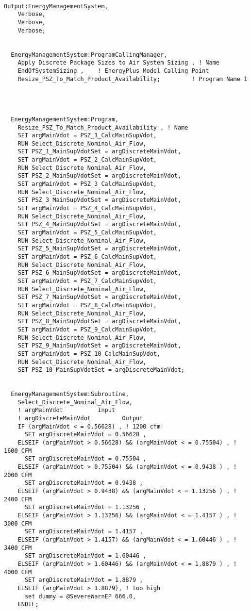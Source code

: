 \begin{lstlisting}

Output:EnergyManagementSystem,
    Verbose,
    Verbose,
    Verbose;


  EnergyManagementSystem:ProgramCallingManager,
    Apply Discrete Package Sizes to Air System Sizing , ! Name
    EndOfSystemSizing ,    ! EnergyPlus Model Calling Point
    Resize_PSZ_To_Match_Product_Availability;         ! Program Name 1




  EnergyManagementSystem:Program,
    Resize_PSZ_To_Match_Product_Availability , ! Name
    SET argMainVdot = PSZ_1_CalcMainSupVdot,
    RUN Select_Discrete_Nominal_Air_Flow,
    SET PSZ_1_MainSupVdotSet = argDiscreteMainVdot,
    SET argMainVdot = PSZ_2_CalcMainSupVdot,
    RUN Select_Discrete_Nominal_Air_Flow,
    SET PSZ_2_MainSupVdotSet = argDiscreteMainVdot,
    SET argMainVdot = PSZ_3_CalcMainSupVdot,
    RUN Select_Discrete_Nominal_Air_Flow,
    SET PSZ_3_MainSupVdotSet = argDiscreteMainVdot,
    SET argMainVdot = PSZ_4_CalcMainSupVdot,
    RUN Select_Discrete_Nominal_Air_Flow,
    SET PSZ_4_MainSupVdotSet = argDiscreteMainVdot,
    SET argMainVdot = PSZ_5_CalcMainSupVdot,
    RUN Select_Discrete_Nominal_Air_Flow,
    SET PSZ_5_MainSupVdotSet = argDiscreteMainVdot,
    SET argMainVdot = PSZ_6_CalcMainSupVdot,
    RUN Select_Discrete_Nominal_Air_Flow,
    SET PSZ_6_MainSupVdotSet = argDiscreteMainVdot,
    SET argMainVdot = PSZ_7_CalcMainSupVdot,
    RUN Select_Discrete_Nominal_Air_Flow,
    SET PSZ_7_MainSupVdotSet = argDiscreteMainVdot,
    SET argMainVdot = PSZ_8_CalcMainSupVdot,
    RUN Select_Discrete_Nominal_Air_Flow,
    SET PSZ_8_MainSupVdotSet = argDiscreteMainVdot,
    SET argMainVdot = PSZ_9_CalcMainSupVdot,
    RUN Select_Discrete_Nominal_Air_Flow,
    SET PSZ_9_MainSupVdotSet = argDiscreteMainVdot,
    SET argMainVdot = PSZ_10_CalcMainSupVdot,
    RUN Select_Discrete_Nominal_Air_Flow,
    SET PSZ_10_MainSupVdotSet = argDiscreteMainVdot;


  EnergyManagementSystem:Subroutine,
    Select_Discrete_Nominal_Air_Flow,
    ! argMainVdot          Input
    ! argDiscreteMainVdot         Output
    IF (argMainVdot < = 0.56628) , ! 1200 cfm
      SET argDiscreteMainVdot = 0.56628 ,
    ELSEIF (argMainVdot > 0.56628) && (argMainVdot < = 0.75504) , ! 1600 CFM
      SET argDiscreteMainVdot = 0.75504 ,
    ELSEIF (argMainVdot > 0.75504) && (argMainVdot < = 0.9438 ) , ! 2000 CFM
      SET argDiscreteMainVdot = 0.9438 ,
    ELSEIF (argMainVdot > 0.9438) && (argMainVdot < = 1.13256 ) , ! 2400 CFM
      SET argDiscreteMainVdot = 1.13256 ,
    ELSEIF (argMainVdot > 1.13256) && (argMainVdot < = 1.4157 ) , ! 3000 CFM
      SET argDiscreteMainVdot = 1.4157 ,
    ELSEIF (argMainVdot > 1.4157) && (argMainVdot < = 1.60446 ) , ! 3400 CFM
      SET argDiscreteMainVdot = 1.60446 ,
    ELSEIF (argMainVdot > 1.60446) && (argMainVdot < = 1.8879 ) , ! 4000 CFM
      SET argDiscreteMainVdot = 1.8879 ,
    ELSEIF (argMainVdot > 1.8879), ! too high
      set dummy = @SevereWarnEP 666.0,
    ENDIF;



\end{lstlisting}
